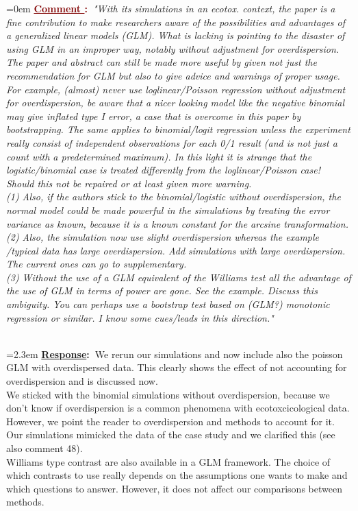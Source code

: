 \documentclass[12pt]{article}
\newcounter{cN}
\newcommand{\comment}[1]{
	\vspace{2em} 
	\refstepcounter{cN} %
	\noindent \hangindent=0em \textbf{\textcolor{Maroon}{\uline{Comment \thecN}:~}}\emph{"#1"}
	}
\newcommand{\response}[1]{
	\\[0.25em] 
	\hangindent=2.3em \textbf{\textcolor{NavyBlue}{\uline{Response}:~}}#1 
	}
\begin{document}
\comment{With its simulations in an ecotox. context, the paper is a fine contribution to make researchers aware of the possibilities and advantages of a generalized linear models (GLM). What is lacking is pointing to the disaster of using GLM in an improper way, notably without adjustment for overdispersion. The paper and abstract can still be made more useful by given not just the recommendation for GLM but also to give advice and warnings of proper usage. For example, (almost) never use loglinear/Poisson regression without adjustment for overdispersion, be aware that a nicer looking model like the negative binomial may give inflated type I error, a case that is overcome in this paper by bootstrapping. The same applies to binomial/logit regression unless the experiment really consist of independent observations for each 0/1 result (and is not just a count with a predetermined maximum). In this light it is strange that the logistic/binomial case is treated differently from
the loglinear/Poisson case! Should this not be repaired or at least given more warning. \\
(1) Also, if the authors stick to the binomial/logistic without overdispersion, the normal model could be made powerful in the simulations by treating the error variance as known, because it is a known constant for the arcsine transformation. \\
(2) Also, the simulation now use slight overdispersion whereas the example /typical data has large overdispersion. Add simulations with large overdispersion. The current ones can go to supplementary. \\
(3) Without the use of a GLM equivalent of the Williams test all the advantage of the use of GLM in terms of power are gone.  See the example. Discuss this ambiguity. You can perhaps use a bootstrap test based on (GLM?) monotonic regression or similar. I know some cues/leads in this direction.}
\response{We rerun our simulations and now include also the poisson GLM with overdispersed data. This clearly shows the effect of not accounting for overdispersion and is discussed now. \\
We sticked with the binomial simulations without overdispersion, because we don't know if overdispersion is a common phenomena with ecotoxcicological data.
However, we point the reader to overdispersion and methods to account for it. \\
Our simulations mimicked the data of the case study and we clarified this (see also comment 48). \\
Williams type contrast are also available in a GLM framework. The choice of which contrasts to use really depends on the assumptions one wants to make and which questions to answer. 
However, it does not affect our comparisons between methods.
}
\end{document}
